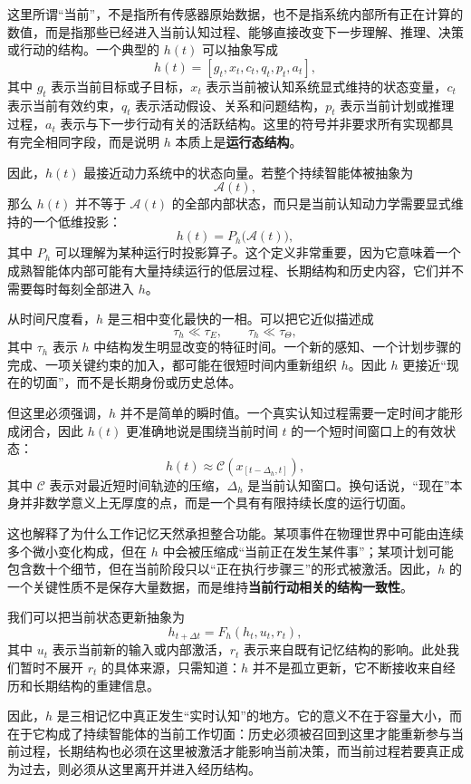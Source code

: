 这里所谓“当前”，不是指所有传感器原始数据，也不是指系统内部所有正在计算的数值，而是指那些已经进入当前认知过程、能够直接改变下一步理解、推理、决策或行动的结构。一个典型的 $h(t)$ 可以抽象写成
\[
h(t)=
\left[
g_t,
x_t,
c_t,
q_t,
p_t,
a_t
\right],
\]
其中 $g_t$ 表示当前目标或子目标，$x_t$ 表示当前被认知系统显式维持的状态变量，$c_t$ 表示当前有效约束，$q_t$ 表示活动假设、关系和问题结构，$p_t$ 表示当前计划或推理过程，$a_t$ 表示与下一步行动有关的活跃结构。这里的符号并非要求所有实现都具有完全相同字段，而是说明 $h$ 本质上是\textbf{运行态结构}。

因此，$h(t)$ 最接近动力系统中的状态向量。若整个持续智能体被抽象为
\[
\mathcal{A}(t),
\]
那么 $h(t)$ 并不等于 $\mathcal{A}(t)$ 的全部内部状态，而只是当前认知动力学需要显式维持的一个低维投影：
\[
h(t)
=
P_h\bigl(\mathcal{A}(t)\bigr),
\]
其中 $P_h$ 可以理解为某种运行时投影算子。这个定义非常重要，因为它意味着一个成熟智能体内部可能有大量持续运行的低层过程、长期结构和历史内容，它们并不需要每时每刻全部进入 $h$。

从时间尺度看，$h$ 是三相中变化最快的一相。可以把它近似描述成
\[
\tau_h
\ll
\tau_E,
\qquad
\tau_h
\ll
\tau_\Theta,
\]
其中 $\tau_h$ 表示 $h$ 中结构发生明显改变的特征时间。一个新的感知、一个计划步骤的完成、一项关键约束的加入，都可能在很短时间内重新组织 $h$。因此 $h$ 更接近“现在的切面”，而不是长期身份或历史总体。

但这里必须强调，$h$ 并不是简单的瞬时值。一个真实认知过程需要一定时间才能形成闭合，因此 $h(t)$ 更准确地说是围绕当前时间 $t$ 的一个短时间窗口上的有效状态：
\[
h(t)
\approx
\mathcal{C}
\left(
x_{[t-\Delta_h,t]}
\right),
\]
其中 $\mathcal{C}$ 表示对最近短时间轨迹的压缩，$\Delta_h$ 是当前认知窗口。换句话说，“现在”本身并非数学意义上无厚度的点，而是一个具有有限持续长度的运行切面。

这也解释了为什么工作记忆天然承担整合功能。某项事件在物理世界中可能由连续多个微小变化构成，但在 $h$ 中会被压缩成“当前正在发生某件事”；某项计划可能包含数十个细节，但在当前阶段只以“正在执行步骤三”的形式被激活。因此，$h$ 的一个关键性质不是保存大量数据，而是维持\textbf{当前行动相关的结构一致性}。

我们可以把当前状态更新抽象为
\[
h_{t+\Delta t}
=
F_h
\left(
h_t,
u_t,
r_t
\right),
\]
其中 $u_t$ 表示当前新的输入或内部激活，$r_t$ 表示来自既有记忆结构的影响。此处我们暂时不展开 $r_t$ 的具体来源，只需知道：$h$ 并不是孤立更新，它不断接收来自经历和长期结构的重建信息。

因此，$h$ 是三相记忆中真正发生“实时认知”的地方。它的意义不在于容量大小，而在于它构成了持续智能体的当前工作切面：历史必须被召回到这里才能重新参与当前过程，长期结构也必须在这里被激活才能影响当前决策，而当前过程若要真正成为过去，则必须从这里离开并进入经历结构。

